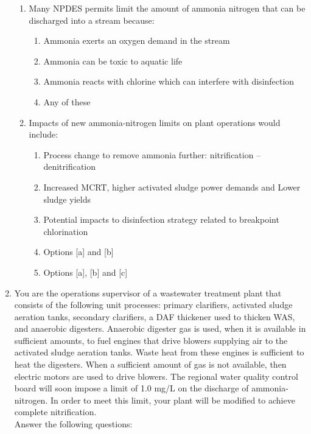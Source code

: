 \begin{enumerate}
\begin{enumerate}[1.]
\item Many NPDES permits limit the amount of ammonia nitrogen that can be discharged into a stream because:
\begin{enumerate}[a]
\item Ammonia exerts an oxygen demand in the stream
\item Ammonia can be toxic to aquatic life
\item Ammonia reacts with chlorine which can interfere with disinfection
\item Any of these
\end{enumerate}
\item Impacts of new ammonia-nitrogen limits on plant operations would include:
\begin{enumerate}[a]
\item Process change to remove ammonia further: nitrification – denitrification
\item Increased MCRT, higher activated sludge power demands and Lower sludge yields
\item Potential impacts to disinfection strategy related to breakpoint chlorination
\item Options [a] and [b]
\item Options [a], [b] and [c]
\end{enumerate}

\end{enumerate}

\newpage
 
\item You are the operations supervisor of a wastewater treatment plant that consists of the following unit processes: primary clarifiers, activated sludge aeration tanks, secondary clarifiers, a DAF thickener used to thicken WAS, and anaerobic digesters. Anaerobic digester gas is used, when it is available in sufficient amounts, to fuel engines that drive blowers supplying air to the activated sludge aeration tanks. Waste heat from these engines is sufficient to heat the digesters. When a sufficient amount of gas is not available, then electric motors are used to drive blowers. The regional water quality control board will soon impose a limit of 1.0 mg/L on the discharge of ammonia-nitrogen. In order to meet this limit, your plant will be modified to achieve complete nitrification.\\
Answer the following questions:


\end{enumerate}
